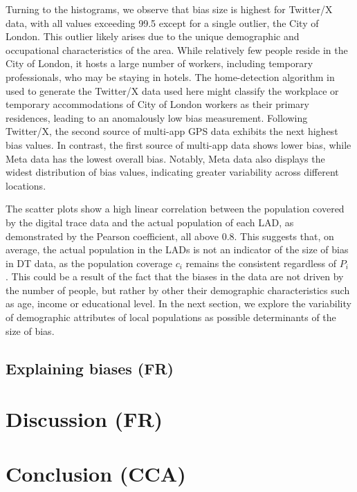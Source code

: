 \documentclass[]{rsos}%
\begin{document}
Turning to the histograms, we observe that bias size is highest for
Twitter/X data, with all values exceeding 99.5 except for a single
outlier, the City of London. This outlier likely arises due to the
unique demographic and occupational characteristics of the area. While
relatively few people reside in the City of London, it hosts a large
number of workers, including temporary professionals, who may be staying
in hotels. The home-detection algorithm in \citep{wang2022} used to generate
the Twitter/X data used here might classify the workplace or temporary
accommodations of City of London workers as their primary residences,
leading to an anomalously low bias measurement. Following Twitter/X, the
second source of multi-app GPS data exhibits the next highest bias
values. In contrast, the first source of multi-app data shows lower
bias, while Meta data has the lowest overall bias. Notably, Meta data
also displays the widest distribution of bias values, indicating greater
variability across different locations.

The scatter plots show a high linear correlation between the population
covered by the digital trace data and the actual population of each LAD,
as demonstrated by the Pearson coefficient, all above 0.8. This suggests
that, on average, the actual population in the LADs is not an indicator
of the size of bias in DT data, as the population coverage \(c_i\) remains
the consistent regardless of \(P_i\) . This could be a result of the fact
that the biases in the data are not driven by the number of people, but
rather by other their demographic characteristics such as age, income or
educational level. In the next section, we explore the variability of
demographic attributes of local populations as possible determinants of
the size of bias.

\hypertarget{explaining-biases-fr}{%
\subsection{Explaining biases (FR)}\label{explaining-biases-fr}}

\hypertarget{discussion-fr}{%
\section{Discussion (FR)}\label{discussion-fr}}

\hypertarget{conclusion-cca}{%
\section{Conclusion (CCA)}\label{conclusion-cca}}
\end{document}
